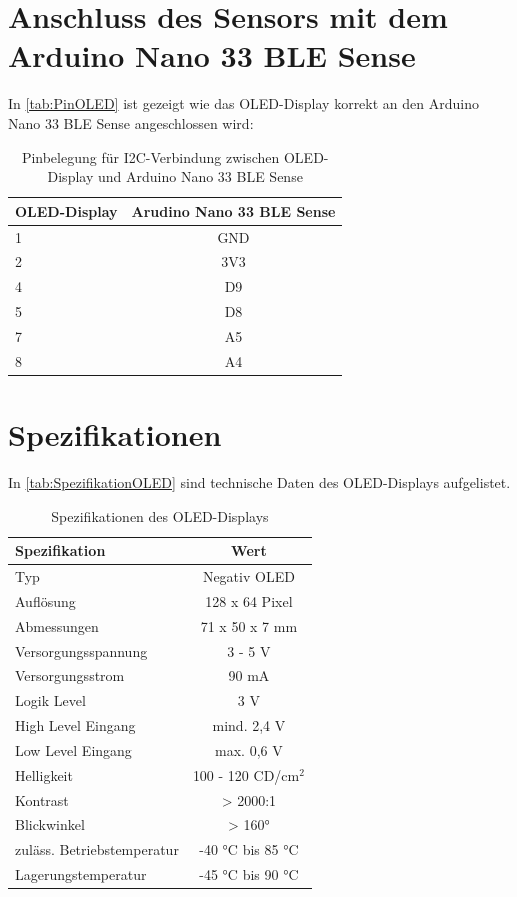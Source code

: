 \section{Anschluss des Sensors mit dem Arduino Nano 33 BLE Sense}

In \autoref{tab:PinOLED} ist gezeigt wie das OLED-Display korrekt an den Arduino Nano 33 BLE Sense angeschlossen wird:

\begin{table}[htpb]
	\centering
	\begin{tabular}{|l|c|}
		\hline
		\textbf{OLED-Display} & \textbf{Arudino Nano 33 BLE Sense} \\
		\hline
		1 & GND \\
		2 & 3V3 \\
		4 & D9 \\
		5 & D8 \\
		7 & A5 \\
		8 & A4 \\
		\hline
	\end{tabular}
	\caption{Pinbelegung für I2C-Verbindung zwischen OLED-Display und Arduino Nano 33 BLE Sense \cite{OLED.2}}
	\label{tab:PinOLED}
\end{table}

\section{Spezifikationen}

In \autoref{tab:SpezifikationOLED} sind technische Daten des OLED-Displays aufgelistet.

\begin{table}[htpb]
	\centering
	\begin{tabular}{|l|c|}
		\hline
		\textbf{Spezifikation} & \textbf{Wert} \\
		\hline
		Typ & Negativ OLED \\
		Auflösung & 128 x 64 Pixel \\
		Abmessungen & 71 x 50 x 7 mm \\
		Versorgungsspannung & 3 - 5 V \\
		Versorgungsstrom & 90 mA \\
		Logik Level & 3 V \\
		High Level Eingang & mind. 2,4 V \\
		Low Level Eingang & max. 0,6 V \\
		Helligkeit & 100 - 120 CD/$\mathrm{cm^2}$ \\
		Kontrast & > 2000:1 \\
		Blickwinkel & > 160° \\
		zuläss. Betriebstemperatur & -40 °C bis 85 °C \\
		Lagerungstemperatur & -45 °C bis 90 °C \\
		\hline
	\end{tabular}
	\caption{Spezifikationen des OLED-Displays \cite{OLED.1}}
	\label{tab:SpezifikationOLED}
\end{table}

